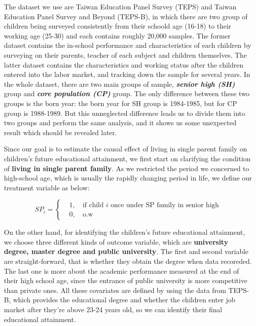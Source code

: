\documentclass[]{AEA}
\begin{document}
    The dataset we use are Taiwan Education Panel Survey (TEPS) and Taiwan Education Panel Survey and Beyond (TEPS-B), in which there are two group of children being surveyed consistently from their schoold age (16-18) to their working age (25-30) and each contains roughly 20,000 samples. The former dataset contains the in-school performance and characteristics of each children by surveying on their parents, teacher of each subject and children themselves. The latter dataset contains the characteristics and working status after the children entered into the labor market, and tracking down the sample for several years.  In the whole dataset, there are two main groups of sample, \textit{\textbf{senior high (SH)}} group and \textit{\textbf{core population (CP)}} group.  The only difference between these two groups is the born year: the born year for SH group is 1984-1985, but for CP group is 1988-1989.  But this unneglected difference leads us to divide them into two groups and perform the same analysis, and it shows us some unexpected result which should be revealed later.

    Since our goal is to estimate the causal effect of living in single parent family on children's future educational attainment, we first start on clarifying the condition of \textbf{living in single parent family}.  As we restricted the period we concerned to high-school age, which is usually the rapidly changing period in life, we define our treatment variable as below:

    \[
        \textit{SP}_i =
        \left\{\begin{aligned}
        &1,\quad\text{if child $i$ once under SP family in senior high} \\
        &0,\quad\text{o.w}
        \end{aligned}\right.
    \]

    On the other hand, for identifying the children's future educational attainment, we choose three different kinds of outcome variable, which are \textbf{university degree, master degree and public university}.   The first and second variable are straight-forward, that is whether they obtain the degree when data recoreded.  The last one is more about the academic performance measured at the end of their high school age, since the entrance of public university is more competitive than private ones.  All these covariates are defined by using the data from TEPS-B, which provides the educational degree and whether the children enter job market after they're above 23-24 years old, so we can identify their final educational attainment.
\end{document}
